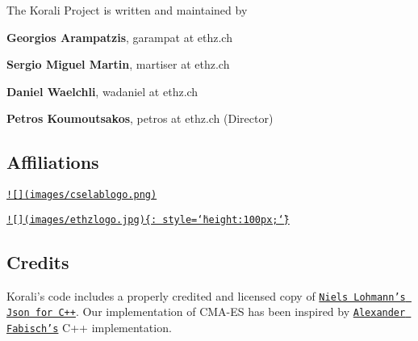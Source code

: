 The Korali Project is written and maintained by


\begin{DoxyItemize}
\item {\bfseries Georgios Arampatzis}, garampat at ethz.\-ch
\item {\bfseries Sergio Miguel Martin}, martiser at ethz.\-ch
\item {\bfseries Daniel Waelchli}, wadaniel at ethz.\-ch
\item {\bfseries Petros Koumoutsakos}, petros at ethz.\-ch (Director)
\end{DoxyItemize}

\subsection*{Affiliations}

\href{https://www.cse-lab.ethz.ch/}{\tt !\mbox{[}\mbox{]}(images/cselablogo.\-png)}\par
\par
 \href{https://www.ethz.ch}{\tt !\mbox{[}\mbox{]}(images/ethzlogo.\-jpg)\{\-: style=\char`\"{}height\-:100px;\char`\"{}\}}

\subsection*{Credits}

Korali's code includes a properly credited and licensed copy of \href{https://github.com/nlohmann/json}{\tt Niels Lohmann's Json for C++}. Our implementation of C\-M\-A-\/\-E\-S has been inspired by \href{https://github.com/AlexanderFabisch/CMA-ESpp}{\tt Alexander Fabisch's} C++ implementation. 